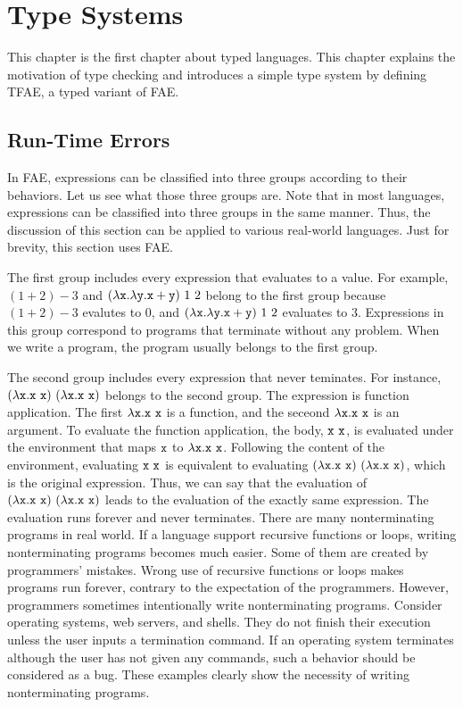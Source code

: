\setchapterpreamble[u]{\margintoc}
\chapter{Type Systems}

\renewcommand{\plang}{\textsf{FAE}\xspace}
\renewcommand{\lang}{\textsf{TFAE}\xspace}

This chapter is the first chapter about typed languages. This chapter explains
the motivation of type checking and introduces a simple type
system by defining \lang, a typed variant of \plang.

\section{Run-Time Errors}

In \plang, expressions can be classified into three groups according to their
behaviors. Let us see what those three groups are. Note that in most languages,
expressions can be classified into three groups in the same manner. Thus, the
discussion of this section can be applied to various real-world languages. Just
for brevity, this section uses \plang.

The first group includes every expression that evaluates to a value. For example,
$(1+2)-3$ and $(\lambda \cx.\lambda \cy.\cx+\cy)\ 1\ 2$ belong to the first
group because $(1+2)-3$ evalutes to $0$, and $(\lambda \texttt{x}.\lambda \texttt{y}.\texttt{x}+\texttt{y})\
1\ 2$ evaluates to $3$. Expressions in this group correspond to programs that
terminate without any problem. When we write a program, the program
usually belongs to the first group.

The second group includes every expression that never teminates. For instance,
$(\lambda \texttt{x}.\texttt{x}\ \texttt{x})\ (\lambda \texttt{x}.\texttt{x}\ \texttt{x})$ belongs to the second group.
The expression is function application. The first $\lambda \texttt{x}.\texttt{x}\ \texttt{x}$ is a
function, and the seceond $\lambda \texttt{x}.\texttt{x}\ \texttt{x}$ is an argument. To evaluate the
function application, the body, $\cx\ \cx$, is evaluated under the environment
that maps $\texttt{x}$ to $\lambda \texttt{x}.\texttt{x}\ \texttt{x}$. Following the content of the
environment, evaluating $\cx\ \cx$ is equivalent to evaluating $(\lambda
\texttt{x}.\texttt{x}\ \texttt{x})\ (\lambda \texttt{x}.\texttt{x}\ \texttt{x})$, which is the original expression. Thus,
we can say that the evaluation of $(\lambda \texttt{x}.\texttt{x}\ \texttt{x})\ (\lambda \texttt{x}.\texttt{x}\
\texttt{x})$ leads to the evaluation of the exactly same expression. The evaluation
runs forever and never terminates. There are many nonterminating programs in
real world. If a language support recursive functions or loops, writing
nonterminating programs becomes much easier. Some of them are created by
programmers' mistakes. Wrong use of recursive functions or loops makes programs
run forever, contrary to the expectation of the programmers. However,
programmers sometimes intentionally write nonterminating programs.
Consider operating systems, web servers, and shells. They do not finish their
execution unless the user inputs a termination command. If an operating system
terminates although the user has not given any commands, such a behavior should
be considered as a bug. These examples clearly show the necessity of writing
nonterminating programs.

